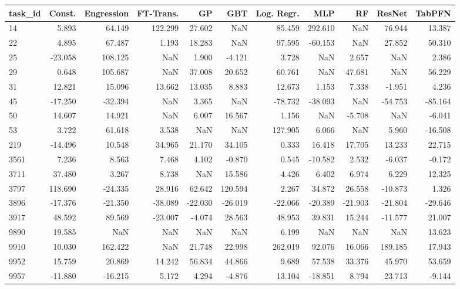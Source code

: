 \begin{tabular}{lrrrrrrrrrr}
\toprule
task\_id & Const. & Engression & FT-Trans. & GP & GBT & Log. Regr. & MLP & RF & ResNet & TabPFN \\
\midrule
14 & 5.893 & 64.149 & 122.299 & 27.602 & NaN & 85.459 & 292.610 & NaN & 76.944 & 13.387 \\
22 & 4.895 & 67.487 & 1.193 & 18.283 & NaN & 97.595 & -60.153 & NaN & 27.852 & 50.310 \\
25 & -23.058 & 108.125 & NaN & 1.900 & -4.121 & 3.728 & NaN & 2.657 & NaN & 2.386 \\
29 & 0.648 & 105.687 & NaN & 37.008 & 20.652 & 60.761 & NaN & 47.681 & NaN & 56.229 \\
31 & 12.821 & 15.096 & 13.662 & 13.035 & 8.883 & 12.673 & 1.153 & 7.338 & -1.951 & 4.236 \\
45 & -17.250 & -32.394 & NaN & 3.365 & NaN & -78.732 & -38.093 & NaN & -54.753 & -85.164 \\
50 & 14.607 & 14.921 & NaN & 6.007 & 16.567 & 1.156 & NaN & -5.708 & NaN & -6.041 \\
53 & 3.722 & 61.618 & 3.538 & NaN & NaN & 127.905 & 6.066 & NaN & 5.960 & -16.508 \\
219 & -14.496 & 10.548 & 34.965 & 21.170 & 34.105 & 0.333 & 16.418 & 17.705 & 13.233 & 22.715 \\
3561 & 7.236 & 8.563 & 7.468 & 4.102 & -0.870 & 0.545 & -10.582 & 2.532 & -6.037 & -0.172 \\
3711 & 37.480 & 3.267 & 8.738 & NaN & 15.586 & 4.426 & 6.402 & 6.974 & 6.229 & 12.325 \\
3797 & 118.690 & -24.335 & 28.916 & 62.642 & 120.594 & 2.267 & 34.872 & 26.558 & -10.873 & 1.326 \\
3896 & -17.376 & -21.350 & -38.089 & -22.030 & -26.019 & -22.066 & -20.389 & -21.903 & -21.804 & -29.646 \\
3917 & 48.592 & 89.569 & -23.007 & -4.074 & 28.563 & 48.953 & 39.831 & 15.244 & -11.577 & 21.007 \\
9890 & 19.585 & NaN & NaN & NaN & NaN & 6.199 & NaN & NaN & NaN & 13.623 \\
9910 & 10.030 & 162.422 & NaN & 21.748 & 22.998 & 262.019 & 92.076 & 16.066 & 189.185 & 17.943 \\
9952 & 15.759 & 20.869 & 14.242 & 56.834 & 44.866 & 9.689 & 57.538 & 33.376 & 45.970 & 53.659 \\
9957 & -11.880 & -16.215 & 5.172 & 4.294 & -4.876 & 13.104 & -18.851 & 8.794 & 23.713 & -9.144 \\

\end{tabular}
